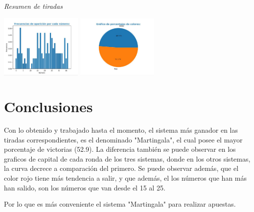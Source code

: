 \documentclass{article}
\begin{document}
    \vspace{1cm}

    {\itshape\Large Resumen de tiradas \par}
    \includegraphics[width=0.3\textwidth]{frecAparicion.JPG}
    \includegraphics[width=0.3\textwidth]{resumenColores.JPG}

    \section{Conclusiones}

    Con lo obtenido y trabajado hasta el momento,
    el sistema más ganador en las tiradas correspondientes, es el denominado "Martingala",
    el cual posee el mayor porcentaje de victorias (52.9).
    La diferencia también se puede observar en los graficos de capital de cada ronda de los tres sistemas, donde
    en los otros sistemas, la curva decrece a comparación del primero. Se puede observar además, que el color rojo tiene más tendencia a salir,
    y que además, el los números que han más han salido, son los números que van desde el 15 al 25.

    Por lo que es más conveniente el sistema "Martingala" para realizar apuestas.
\end{document}
